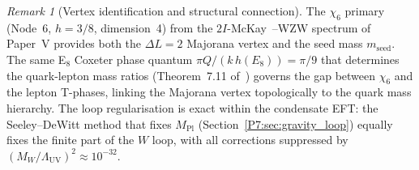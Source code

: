 \documentclass[11pt,a4paper]{article}
\theoremstyle{definition}
\theoremstyle{remark}
\newtheorem{remark}[theorem]{Remark}
\newcommand{\MPl}{M_{\mathrm{Pl}}}
\newcommand{\LUV}{\Lambda_{\mathrm{UV}}}
\begin{document}
\begin{remark}[Vertex identification and structural connection]
\label{P7:rem:neutrino}
The $\chi_6$ primary (Node~6, $h=3/8$, dimension~4) from the
$2I$-McKay~\cite{McKay1980}--WZW spectrum of Paper~V provides both the
$\Delta L=2$ Majorana vertex and the seed mass $m_\mathrm{seed}$.
The same E$_8$ Coxeter phase quantum $\pi Q/(k\,h(E_8))=\pi/9$
that determines the quark-lepton mass ratios
(Theorem~7.11 of~\cite{Paper5}) governs the gap between $\chi_6$
and the lepton T-phases, linking the Majorana vertex topologically
to the quark mass hierarchy.
The loop regularisation is exact within the condensate EFT:
the Seeley--DeWitt method that fixes $\MPl$ (Section~\ref{P7:sec:gravity_loop})
equally fixes the finite part of the $W$ loop, with all corrections
suppressed by $(M_W/\LUV)^2\approx10^{-32}$.
\end{remark}

\newpage
\label{P7:sec:tier}
\end{document}
